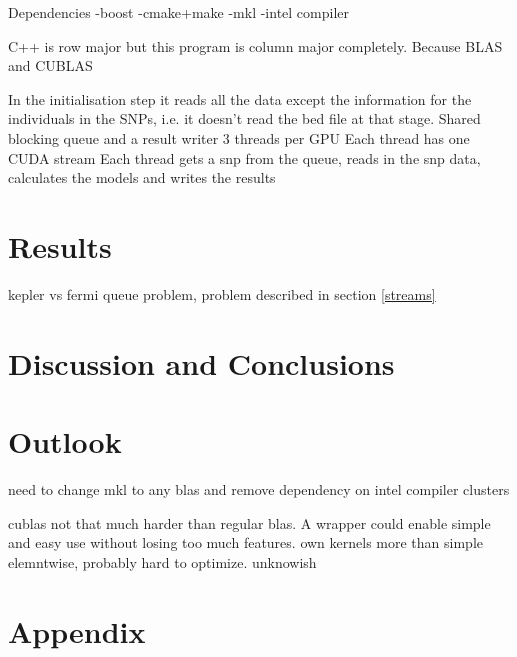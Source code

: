 \documentclass[10pt,a4paper]{report}
\begin{document}
Dependencies
-boost
-cmake+make
-mkl
-intel compiler

C++ is row major but this program is column major completely. Because BLAS and CUBLAS

In the initialisation step it reads all the data except the information for the individuals in the SNPs, i.e. it doesn't read the bed file at that stage.
Shared blocking queue and a result writer
3 threads per GPU
Each thread has one CUDA stream
Each thread gets a snp from the queue, reads in the snp data, calculates the models and writes the results


\chapter{Results}



kepler vs fermi queue problem, problem described in section \ref{streams}

\chapter{Discussion and Conclusions}

\chapter{Outlook}

need to change mkl to any blas and remove dependency on intel compiler
clusters

cublas not that much harder than regular blas. A wrapper could enable simple and easy use without losing too much features.
own kernels more than simple elemntwise, probably hard to optimize. unknowish

\chapter{Appendix}
\end{document}
